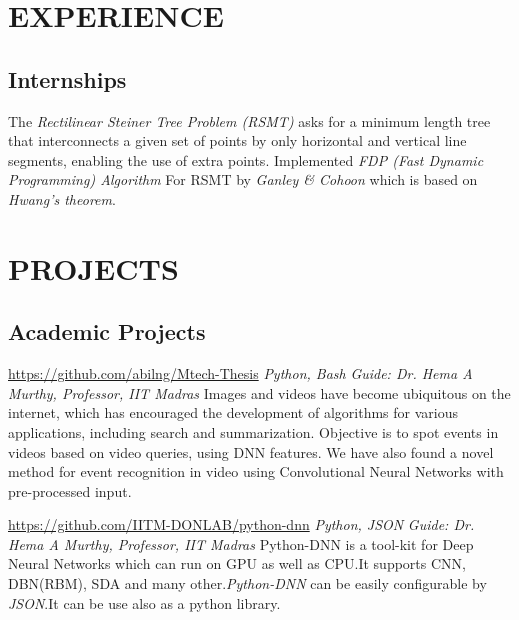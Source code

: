 \documentclass[11pt, a4paper, sans]{moderncv}
\begin{document}
\section{EXPERIENCE}
\subsection{Internships}

{The \textit{Rectilinear Steiner Tree Problem (RSMT)} asks for a minimum length tree that interconnects a given set of points by only horizontal and vertical line segments, enabling the use of extra points. Implemented \textit{ FDP (Fast Dynamic Programming) Algorithm } For RSMT by \textit{ Ganley \& Cohoon } which is based on \textit{ Hwang’s theorem}}.

\section{PROJECTS}
\subsection{Academic Projects}
{\newline \url{https://github.com/abilng/Mtech-Thesis}}
{\hfill \textit{Python, Bash}}
{\newline \textit{Guide: Dr. Hema A Murthy, Professor, IIT Madras}}
{Images and videos have become ubiquitous on the internet, which has encouraged the development of algorithms for various applications, including search and summarization. Objective is to spot events in videos based on video queries, using DNN features. We have also found a novel method for event recognition in video using Convolutional Neural Networks with pre-processed input.}

{\newline \url{https://github.com/IITM-DONLAB/python-dnn}}
{\hfill \textit{Python, JSON}}
{\newline \textit{Guide: Dr. Hema A Murthy, Professor, IIT Madras}}
{Python-DNN is a tool-kit for Deep Neural Networks which can run on GPU as well as CPU.It supports CNN, DBN(RBM), SDA and many other.\textit{Python-DNN} can be easily configurable by \textit{JSON}.It can be use also as a python library.\newline}
\end{document}
